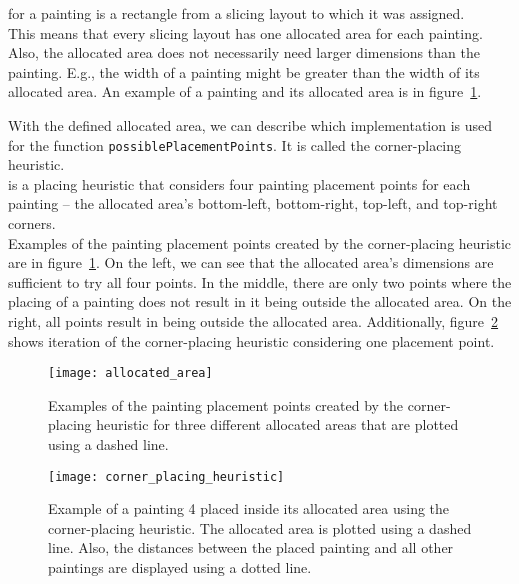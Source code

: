  for a painting is a rectangle from a slicing layout to which it was assigned.\\

This means that every slicing layout has one allocated area for each painting.
Also, the allocated area does not necessarily need larger dimensions than the painting.
E.g., the width of a painting might be greater than the width of its allocated area.
An example of a painting and its allocated area is in figure~\ref{fig:allocated-area}.

With the defined allocated area,
we can describe which implementation is used for the function \verb|possiblePlacementPoints|.
It is called the corner-placing heuristic.\\

 is a placing heuristic that considers four painting placement points for each painting
– the allocated area's bottom-left, bottom-right, top-left, and top-right corners.\\

Examples of the painting placement points created by the corner-placing heuristic are in figure~\ref{fig:allocated-area}.
On the left, we can see that the allocated area's dimensions are sufficient
to try all four points.
In the middle, there are only two points where the placing of a painting does not
result in it being outside the allocated area.
On the right, all points result in being outside the allocated area.
Additionally, figure~\ref {fig:corner-placing-heuristic} shows iteration of the corner-placing heuristic considering one placement point.

\begin{figure}[h!]
    \texttt{[image: allocated\_area]}
    \caption[Examples of the painting placement points created by the corner-placing heuristic]
    {Examples of the painting placement points created by the corner-placing heuristic
    for three different allocated areas that are plotted using a dashed line.}
    \label{fig:allocated-area}
\end{figure}

\begin{figure}[h!]
    \texttt{[image: corner\_placing\_heuristic]}
    \caption[Painting placement example]
    {Example of a painting 4 placed inside its allocated area using the corner-placing heuristic.
    The allocated area is plotted using a dashed line.
    Also, the distances between the placed painting and all other paintings are displayed using a dotted line.}
    \label{fig:corner-placing-heuristic}
\end{figure}
